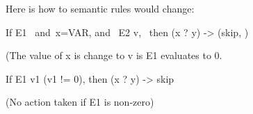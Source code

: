 \documentclass[11pt]{article}
\begin{document}
\begin{enumerate}
\begin{enumerate}
Here is how to semantic rules would change:

If E1 \  and\  x=VAR, and \ E2 \Downarrow v, \ then (x ? y) -> (skip, \rho[ 7 -> v])

(The value of x is change to v is E1 evaluates to 0.


If E1 \Downarrow v1 (v1 != 0), then (x ? y) -> skip

(No action taken if E1 is non-zero)


\end{enumerate}

\end{enumerate}
\end{document}
